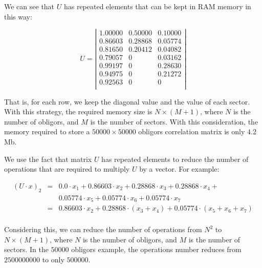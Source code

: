 \documentclass[a4paper,12pt,final]{article}
\begin{document}
We can see that $U$ has repeated elements that can be kept in RAM memory in 
this way:

\begin{displaymath}
U = \left|
\begin{array}{c|cc}
 1.00000 & 0.50000 & 0.10000 \\
 0.86603 & 0.28868 & 0.05774 \\
 0.81650 & 0.20412 & 0.04082 \\
 0.79057 & 0       & 0.03162 \\
 0.99197 & 0       & 0.28630 \\
 0.94975 & 0       & 0.21272 \\
 0.92563 & 0       & 0       \\
\end{array}
\right|
\end{displaymath}

That is, for each row, we keep the diagonal value and the value of each sector. 
With this strategy, the required memory size is $N \times (M+1)$, where $N$ is
the number of obligors, and $M$ is the number of sectors. With this consideration,
the memory required to store a $50000 \times 50000$ obligors correlation matrix
is only $4.2$ Mb.
\newline

We use the fact that matrix $U$ has repeated elements to reduce the number of 
operations that are required to multiply $U$ by a vector. For example:

\begin{displaymath}
\begin{array}{rcl}
(U \cdot x)_2 & = & 0.0 \cdot x_1 + 0.86603 \cdot x_2 + 0.28868 \cdot x_3 + 0.28868 \cdot x_4 +     \\
              &   & 0.05774 \cdot x_5 + 0.05774 \cdot x_6 + 0.05774 \cdot x_7                       \\
              & = & 0.86603 \cdot x_2 + 0.28868 \cdot (x_3 + x_4) + 0.05774 \cdot (x_5 + x_6 + x_7) \\
\end{array}
\end{displaymath}

Considering this, we can reduce the number of operations from $N^2$ to 
$N \times (M+1)$, where $N$ is the number of obligors, and $M$ is the number of 
sectors. In the $50000$ obligors example, the operations number reduces from 
$2500000000$ to only $500000$.

\end{document}
